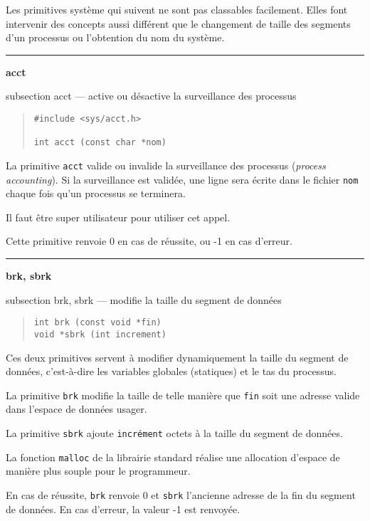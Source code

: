\documentclass [twoside] {report}
\newcommand {\primitive} [1]
    {
	{\large \bf #1}
	\addcontentsline {toc} {subsection} {#1}
    }
\newcommand {\separation}
    {
	\vspace {7mm}
	\nopagebreak
	\hrule
    }
\begin{document}
Les primitives système qui suivent ne sont pas
classables facilement. Elles font intervenir des
concepts aussi différent que le changement de
taille des segments d'un processus ou l'obtention
du nom du système.




\separation
\primitive {acct} --- active ou désactive la surveillance des processus

\begin {quote}
\begin {verbatim}
#include <sys/acct.h>

int acct (const char *nom)
\end{verbatim}
\end {quote}

La primitive {\tt acct} valide ou invalide la
surveillance des processus ({\it process
accounting}). Si la surveillance est validée, une
ligne sera écrite dans le fichier {\tt nom} chaque
fois qu'un processus se terminera.

Il faut être super utilisateur pour utiliser cet
appel.

Cette primitive renvoie 0 en cas de réussite, ou
-1 en cas d'erreur.




\separation
\primitive {brk, sbrk} --- modifie la taille du segment de données

\begin {quote}
\begin {verbatim}
int brk (const void *fin)
void *sbrk (int increment)
\end{verbatim}
\end {quote}

Ces deux primitives servent à modifier dynamiquement la taille du
segment de données, c'est-à-dire les variables globales (statiques) et
le tas du processus.

La primitive {\tt brk} modifie la taille de telle manière que {\tt fin}
soit une adresse valide dans l'espace de données usager.

La primitive {\tt sbrk} ajoute {\tt incrément} octets à la taille du
segment de données.

La fonction {\tt malloc} de la librairie standard réalise une allocation
d'espace de manière plus souple pour le programmeur.

En cas de réussite, {\tt brk} renvoie 0 et {\tt sbrk} l'ancienne adresse
de la fin du segment de données.  En cas d'erreur, la valeur -1 est
renvoyée.
\end{document}
